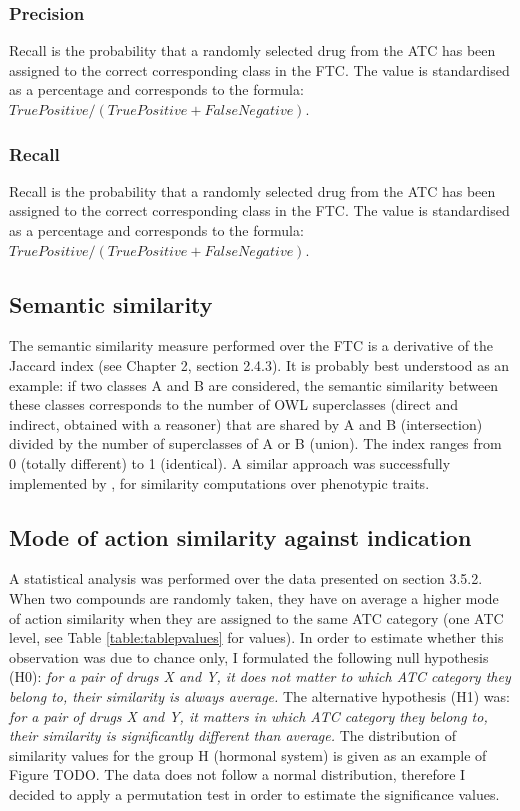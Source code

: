 \subsubsection{Precision}
Recall is the probability that a randomly selected drug from the ATC has been assigned to the correct corresponding class in the FTC. The value is standardised as a percentage and corresponds to the formula: $ True Positive / (True Positive + False Negative) $.

\subsubsection{Recall}
Recall is the probability that a randomly selected drug from the ATC has been assigned to the correct corresponding class in the FTC. The value is standardised as a percentage and corresponds to the formula: $ True Positive / (True Positive + False Negative) $.

\subsection{Semantic similarity}
The semantic similarity measure performed over the FTC is a derivative of the Jaccard index \citep{jaccard1912distribution} \citep{rogers1960computer} (see Chapter 2, section 2.4.3). It is probably best understood as an example: if two classes A and B are considered, the semantic similarity between these classes corresponds to the number of OWL superclasses (direct and indirect, obtained with a reasoner) that are shared by A and B (intersection) divided by the number of superclasses of A or B (union). The index ranges from 0 (totally different) to 1 (identical). A similar approach was successfully implemented by \citep{hoehndorf2011phenomenet}, for similarity computations over phenotypic traits.

\subsection{Mode of action similarity against indication}
\label{moa-pvalues}
A statistical analysis was performed over the data presented on section 3.5.2. When two compounds are randomly taken, they have on average a higher mode of action similarity when they are assigned to the same ATC category (one ATC level, see Table \ref{table:tablepvalues} for values). In order to estimate whether this observation was due to chance only, I formulated the following null hypothesis (H0): \emph{for a pair of drugs X and Y, it does not matter to which ATC category they belong to, their similarity is always average.} The alternative hypothesis (H1) was: \emph{for a pair of drugs X and Y, it matters in which ATC category they belong to, their similarity is significantly different than average.}
The distribution of similarity values for the group H (hormonal system) is given as an example of Figure TODO. The data does not follow a normal distribution, therefore I decided to apply a permutation test in order to estimate the significance values.


